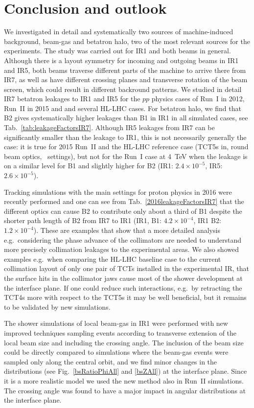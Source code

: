 \section{Conclusion and outlook~\label{last}}

We investigated in detail and systematically two sources of machine-induced background, beam-gas and betatron halo, two of the most relevant sources for the experiments. The study was carried out for IR1 and both beams in general. Although there is a layout symmetry for incoming and outgoing beams in IR1 and IR5, both beams traverse different parts of the machine to arrive there from IR7, as well as have different crossing planes and transverse rotation of the beam screen, which could result in different backround patterns. We studied in detail IR7 betatron leakages to IR1 and IR5 for the $pp$ physics cases of Run~I in 2012, Run~II in 2015 and and several HL-LHC cases. For betatron halo, we find that B2 gives systematically higher leakages than B1 in IR1 in all simulated cases, see Tab.~\ref{tab:leakageFactorsIR7}. Although IR5 leakages from IR7 can be significantly smaller than the leakage to IR1, this is not necessarily generally the case: it is true for 2015 Run~II and the HL-LHC reference case (TCT5s in, round beam optics, \twosigmaret~settings), but not for the Run~I case at 4~TeV when the leakage is on a similar level for B1 and slightly higher for B2 (IR1: $2.4 \times 10^{-5}$, IR5: $2.6 \times 10^{-5}$).

Tracking simulations with the main settings for proton physics in 2016 were recently performed and one can see from Tab.~\ref{2016leakageFactorsIR7} that the different optics can cause B2 to contribute only about a third of B1 despite the shorter path length of B2 from IR7 to IR1 (IR1, B1: $4.2 \times 10^{-4}$, IR1 B2:$1.2 \times 10^{-4}$). These are examples that show that a more detailed analysis e.g.~considering the phase advance of the collimators are needed to understand more precisely collimation leakages to the experimental areas. We also showed examples e.g.~when comparing the HL-LHC baseline case to the current collimation layout of only one pair of TCTs installed in the experimental IR, that the surface hits in the collimator jaws cause most of the shower development at the interface plane. If one could reduce such interactions, e.g.~by retracting the TCT4s more with respect to the TCT5s it may be well beneficial, but it remains to be validated by new simulations.

The shower simulations of local beam-gas in IR1 were performed with new improved techniques sampling events according to transverse extension of the local beam size and including the crossing angle. The inclusion of the beam size could be directly compared to simulations where the beam-gas events were sampled only along the central orbit, and we find minor changes in the distributions (see Fig.~\ref{bsRatioPhiAll} and \ref{bsZAll}) at the interface plane. Since it is a more realistic model we used the new method also in Run~II simulations. The crossing angle was found to have a major impact in angular distributions at the interface plane.

